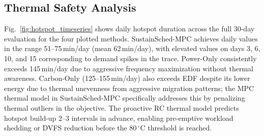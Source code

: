 \documentclass[a4paper,fleqn]{cas-dc}
\begin{document}
\subsection{Thermal Safety Analysis}
\label{sec:thermal_analysis}

Fig.~\ref{fig:hotspot_timeseries} shows daily hotspot duration across the full 30-day evaluation for the four plotted methods. SustainSched-MPC achieves daily values in the range 51--75\,min/day (mean 62\,min/day), with elevated values on days 3, 6, 10, and 15 corresponding to demand spikes in the trace. Power-Only consistently exceeds 145\,min/day due to aggressive frequency maximization without thermal awareness. Carbon-Only (125--155\,min/day) also exceeds EDF despite its lower energy due to thermal unevenness from aggressive migration patterns; the MPC thermal model in SustainSched-MPC specifically addresses this by penalizing thermal outliers in the objective. The proactive RC thermal model predicts hotspot build-up 2--3 intervals in advance, enabling pre-emptive workload shedding or DVFS reduction before the 80$\,^\circ$C threshold is reached.
\end{document}
